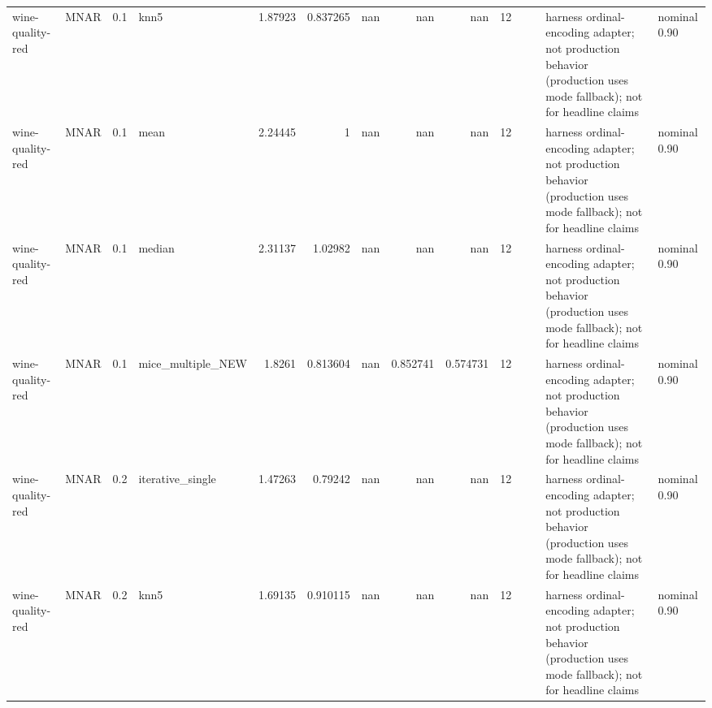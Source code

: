 \begin{table}[ht]
\begin{tabular}{llrlrrrrrrllll}
 wine-quality-red     & MNAR        &         0.1 & knn5              &       1.87923  &             0.837265 &               nan        &                     nan        &                       nan        &        12 &                    &                                         & harness ordinal-encoding adapter; not production behavior (production uses mode fallback); not for headline claims & nominal 0.90              \\
 wine-quality-red     & MNAR        &         0.1 & mean              &       2.24445  &             1        &               nan        &                     nan        &                       nan        &        12 &                    &                                         & harness ordinal-encoding adapter; not production behavior (production uses mode fallback); not for headline claims & nominal 0.90              \\
 wine-quality-red     & MNAR        &         0.1 & median            &       2.31137  &             1.02982  &               nan        &                     nan        &                       nan        &        12 &                    &                                         & harness ordinal-encoding adapter; not production behavior (production uses mode fallback); not for headline claims & nominal 0.90              \\
 wine-quality-red     & MNAR        &         0.1 & mice\_multiple\_NEW &       1.8261   &             0.813604 &               nan        &                       0.852741 &                         0.574731 &        12 &                    &                                         & harness ordinal-encoding adapter; not production behavior (production uses mode fallback); not for headline claims & nominal 0.90              \\
 wine-quality-red     & MNAR        &         0.2 & iterative\_single  &       1.47263  &             0.79242  &               nan        &                     nan        &                       nan        &        12 &                    &                                         & harness ordinal-encoding adapter; not production behavior (production uses mode fallback); not for headline claims & nominal 0.90              \\
 wine-quality-red     & MNAR        &         0.2 & knn5              &       1.69135  &             0.910115 &               nan        &                     nan        &                       nan        &        12 &                    &                                         & harness ordinal-encoding adapter; not production behavior (production uses mode fallback); not for headline claims & nominal 0.90              \\

\end{tabular}
\end{table}
